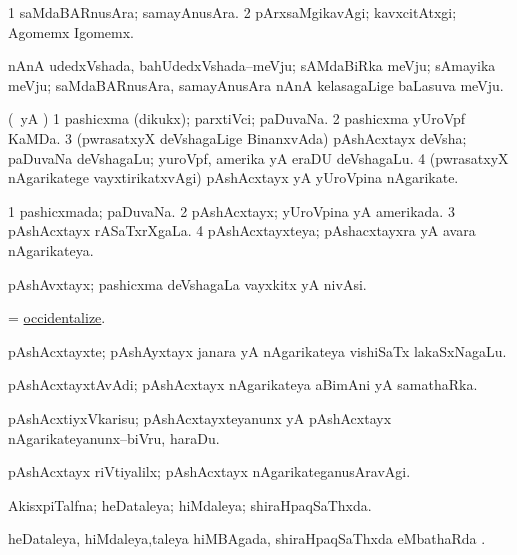 \bentry
{}
\gl{\kirxvi}
\bmng
\bnum
\num{1} saMdaBARnusAra; samayAnusAra. 
\num{2} pArxsaMgikavAgi; kavxcitAtxgi; Agomemx Igomemx. 
\enum
\emng
\eentry

\bentry
{}
\gl{\nA}
\bmng
nAnA udedxVshada, bahUdedxVshada--meVju; sAMdaBiRka meVju; sAmayika meVju; saMdaBARnusAra, samayAnusAra nAnA kelasagaLige baLasuva meVju. 
\emng
\eentry

\bentry
{}
\gl{\nA}
\bmng
(\kAparx\ yA \alaMshA) 
\bnum
\num{1} pashicxma (dikukx); parxtiVci; paDuvaNa. 
\num{2} pashicxma yUroVpf KaMDa. 
\num{3} (pwrasatxyX deVshagaLige BinanxvAda) pAshAcxtayx deVsha; paDuvaNa deVshagaLu; yuroVpf, amerika yA eraDU deVshagaLu. 
\num{4} (pwrasatxyX nAgarikatege vayxtirikatxvAgi) pAshAcxtayx yA yUroVpina nAgarikate. 
\enum
\emng
\eentry

\bentry
{}
\gl{\gu}
\bmng
\bnum
\num{1} pashicxmada; paDuvaNa. 
\num{2} pAshAcxtayx; yUroVpina yA amerikada. 
\num{3} pAshAcxtayx rASaTxrXgaLa. 
\num{4} pAshAcxtayxteya; pAshacxtayxra yA avara nAgarikateya. 
\enum
\emng
\eentry

\bentry
{}
\gl{\nA}
\bmng
pAshAvxtayx; pashicxma deVshagaLa vayxkitx yA nivAsi. 
\emng
\eentry

\bentry
{}
\gl{\sakirx}
\bmng
= \hyperlink{occidentalize}{occidentalize}. 
\emng
\eentry

\bentry
{}
\gl{\nA}
\bmng
pAshAcxtayxte; pAshAyxtayx janara yA nAgarikateya vishiSaTx lakaSxNagaLu. 
\emng
\eentry

\bentry
{}
\gl{\nA}
\bmng
pAshAcxtayxtAvAdi; pAshAcxtayx nAgarikateya aBimAni yA samathaRka. 
\emng
\eentry

\bentry
{}
\gl{\sakirx}
\bmng
pAshAcxtiyxVkarisu; pAshAcxtayxteyanunx yA pAshAcxtayx nAgarikateyanunx--biVru, haraDu. 
\emng
\eentry

\bentry
{}
\gl{\kirxvi}
\bmng
pAshAcxtayx riVtiyalilx; pAshAcxtayx nAgarikateganusAravAgi. 
\emng
\eentry

\bentry
{}
\gl{\gu}
\bmng
AkisxpiTalfna; heDataleya; hiMdaleya; shiraHpaqSaThxda. 
\emng
\eentry

\bentry
{}
\gl{\sapUpa}
\bmng
heDataleya, hiMdaleya,taleya hiMBAgada, shiraHpaqSaThxda eMbathaRda \sapUpa. 
\emng
\eentry

